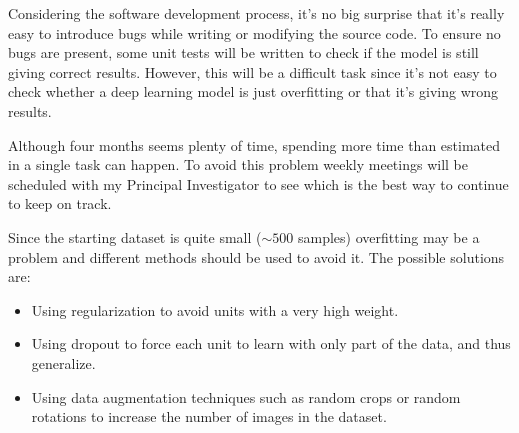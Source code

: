 Considering the software development process, it's no big surprise that it's really easy to
introduce bugs while writing or modifying the source code. To ensure no bugs are present,
some unit tests will be written to check if the model is still giving correct results.
However, this will be a difficult task since it's not easy to check whether a deep 
learning model is just overfitting or that it's giving wrong results.


Although four months seems plenty of time, spending more time than estimated in a single task
can happen. To avoid this problem weekly meetings will be scheduled with my Principal Investigator
to see which is the best way to continue to keep on track.


Since the starting dataset is quite small (\( \sim 500 \) samples) overfitting may be a problem
and different methods should be used to avoid it. The possible solutions are:
\begin{itemize}
  \item Using regularization to avoid units with a very high weight.
  \item Using dropout to force each unit to learn with only part of the data, and thus generalize.
  \item Using data augmentation techniques such as random crops or random rotations to increase
  the number of images in the dataset.
\end{itemize}
